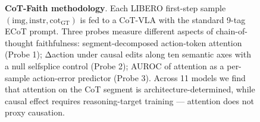 \begin{figure}[t]
\caption{\textbf{CoT-Faith methodology}. Each LIBERO first-step
sample $(\mathrm{img}, \mathrm{instr}, \mathrm{cot}_\text{GT})$ is fed
to a CoT-VLA with the standard 9-tag ECoT prompt. Three probes measure
different aspects of chain-of-thought faithfulness: segment-decomposed
action-token attention (Probe 1); Δaction under causal edits along ten
semantic axes with a null selfsplice control (Probe 2); AUROC of
attention as a per-sample action-error predictor (Probe 3). Across
11 models we find that attention on the CoT segment is
architecture-determined, while causal effect requires reasoning-target
training — attention does not proxy causation.}
\label{fig:workflow}
\end{figure}
